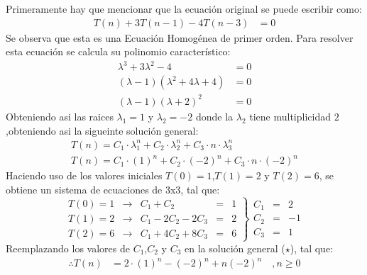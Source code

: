 \begin{solution}
Primeramente hay que mencionar que la ecuación original se puede escribir como:
\begin{align*}
    T(n) +3 T(n-1) -4T(n-3) &= 0
\end{align*}
Se observa que esta es una Ecuación Homogénea de primer orden. Para resolver esta ecuación se calcula su polinomio característico:
\begin{align*}
    \lambda^3+3\lambda^2-4&=0\\
    (\lambda-1)(\lambda^2 +4\lambda+4)&=0\\
    (\lambda-1)(\lambda+2)^2&=0
\end{align*}
Obteniendo asi las raices $\lambda_1 =1$ y $\lambda_2 = -2$ donde la $\lambda_2$ tiene multiplicidad $2$,obteniendo asi la sigueinte solución general:
\begin{align*}
    T(n) = C_1 \cdot \lambda_1^n + C_2 \cdot \lambda_2^n + C_3\cdot n\cdot \lambda_3^n \\
    T(n) = C_1 \cdot (1)^n + C_2 \cdot (-2)^n + C_3\cdot n\cdot (-2)^n \tag{$\star$}
\end{align*}
Haciendo uso de los valores iniciales $T(0)=1$,$T(1)=2$ y $T(2)=6$, se obtiene un sistema de ecuaciones de 3x3, tal que:
$$
  \left.
    \begin{array}{rcrrcr}
      T(0)=1 &\rightarrow& C_1 + C_2 &=&1\\
      T(1)=2 &\rightarrow& C_1 - 2C_2 -2C_3 &=&2\\
      T(2)=6 &\rightarrow& C_1 + 4C_2+8C_3 &=&6
      \end{array}
  \right\}
  \begin{array}{rcr}
       C_1&=&2  \\
       C_2&=&-1  \\
       C_3&=& 1
  \end{array}
$$
Reemplazando los valores de $C_1$,$C_2$ y $C_3$ en la solución general ($\star$), tal que:
\begin{align*}
    \therefore T(n) &= 2 \cdot (1)^n - (-2)^n + n(-2)^n\quad, n\ge0
\end{align*}
\end{solution}